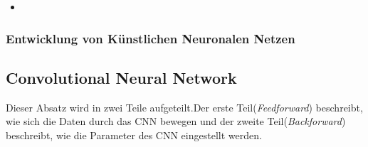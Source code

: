 \documentclass[12pt,a4paper]{scrartcl}
\numberwithin{equation}{section}
\begin{document}
\begin{itemize}
	\item  
\end{itemize}

\subsubsection{Entwicklung von Künstlichen Neuronalen Netzen } \label{Entwicklung}



\subsection{Convolutional Neural Network}
Dieser Absatz wird in zwei Teile aufgeteilt.Der erste Teil(\textit{Feedforward}) beschreibt, wie sich die Daten durch das \ac{CNN} bewegen und der zweite Teil(\textit{Backforward}) beschreibt, wie die Parameter des \ac{CNN} eingestellt werden.
\end{document}
